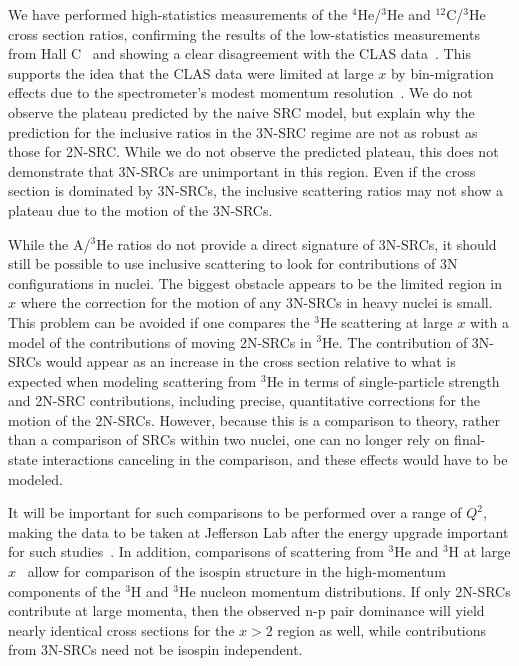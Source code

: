 

We have performed high-statistics measurements of the $^4$He/$^3$He and $^{12}$C/$^3$He cross section
ratios, confirming the results of the low-statistics measurements from Hall C~\cite{fomin2012} and showing
a clear disagreement with the CLAS data~\cite{PhysRevLett.96.082501}. This supports the idea that the CLAS
data were limited at large $x$ by bin-migration effects due to the spectrometer's modest momentum
resolution~\cite{Higinbotham:2014xna}. We do not observe the plateau predicted by the naive SRC model, but
explain why the prediction for the inclusive ratios in the 3N-SRC regime are not as robust as those for
2N-SRC. While we do not observe the predicted plateau, this does not demonstrate that 3N-SRCs are
unimportant in this region. Even if the cross section is dominated by 3N-SRCs, the inclusive scattering
ratios may not show a plateau due to the motion of the 3N-SRCs.

While the A/$^3$He ratios do not provide a direct signature of 3N-SRCs, it should still be possible to use
inclusive scattering to look for contributions of 3N configurations in nuclei. The biggest obstacle appears
to be the limited region in $x$ where the correction for the motion of any 3N-SRCs in heavy nuclei is small.
This problem can be avoided if one compares the $^3$He scattering at large $x$ with a model of the
contributions of moving 2N-SRCs in $^3$He. The contribution of 3N-SRCs would appear as an increase in the
cross section relative to what is expected when modeling scattering from $^3$He in terms of single-particle
strength and 2N-SRC contributions, including precise, quantitative corrections for the motion of the
2N-SRCs. However, because this is a comparison to theory, rather than a comparison of SRCs within two
nuclei, one can no longer rely on final-state interactions canceling in the comparison, and these effects
would have to be modeled.

It will be important for such comparisons to be performed over a range of $Q^2$, making the data to be taken
at Jefferson Lab after the energy upgrade important for such studies~\cite{e1206105}. In addition,
comparisons of scattering from $^3$He and $^3$H at large $x$~\cite{e1211112} allow for comparison of the
isospin structure in the high-momentum components of the $^3$H and $^3$He nucleon momentum distributions. If
only 2N-SRCs contribute at large momenta, then the observed n-p pair dominance will yield nearly identical
cross sections for the $x>2$ region as well, while contributions from 3N-SRCs need not be isospin independent.


